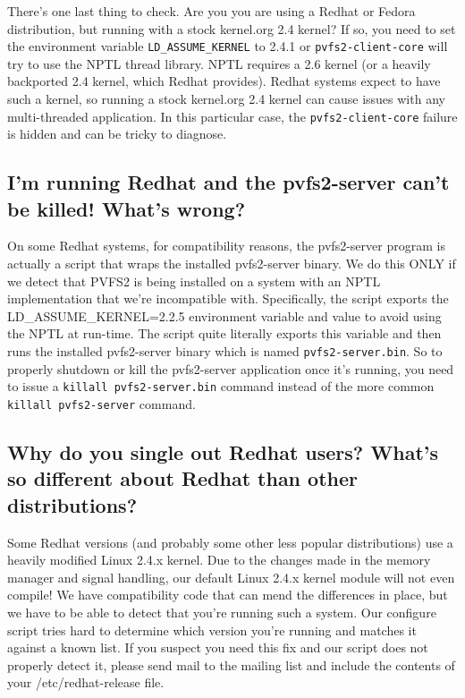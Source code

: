 \documentclass[11pt,letterpaper]{article}
\begin{document}
There's one last thing to check.  Are you you are using a Redhat or Fedora
distribution, but running with a stock kernel.org 2.4 kernel?  If so, you need
to set the environment variable \texttt{LD\_ASSUME\_KERNEL} to 2.4.1 or
\texttt{pvfs2-client-core} will try to use the NPTL thread library.  NPTL
requires a 2.6 kernel (or a heavily backported 2.4 kernel, which Redhat
provides).  Redhat systems expect to have such a kernel, so running a stock
kernel.org 2.4 kernel can cause issues with any multi-threaded application.  In
this particular case, the \texttt{pvfs2-client-core} failure is hidden and can
be tricky to diagnose. 

\subsection{I'm running Redhat and the pvfs2-server can't be killed! What's wrong?}

On some Redhat systems, for compatibility reasons, the pvfs2-server
program is actually a script that wraps the installed pvfs2-server
binary.  We do this ONLY if we detect that PVFS2 is being installed on
a system with an NPTL implementation that we're incompatible with.
Specifically, the script exports the LD\_ASSUME\_KERNEL=2.2.5
environment variable and value to avoid using the NPTL at run-time.
The script quite literally exports this variable and then runs the
installed pvfs2-server binary which is named
\texttt{pvfs2-server.bin}.  So to properly shutdown or kill the
pvfs2-server application once it's running, you need to issue a
\texttt{killall pvfs2-server.bin} command instead of the more common
\texttt{killall pvfs2-server} command.

\subsection{Why do you single out Redhat users?  What's so different
  about Redhat than other distributions?}

Some Redhat versions (and probably some other less popular
distributions) use a heavily modified Linux 2.4.x kernel.  Due to the
changes made in the memory manager and signal handling, our default
Linux 2.4.x kernel module will not even compile!  We have
compatibility code that can mend the differences in place, but we have
to be able to detect that you're running such a system.  Our configure
script tries hard to determine which version you're running and
matches it against a known list.  If you suspect you need this fix and
our script does not properly detect it, please send mail to the
mailing list and include the contents of your /etc/redhat-release
file.
\end{document}
